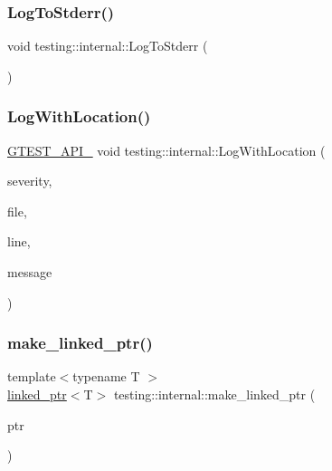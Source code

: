 \subsubsection{\texorpdfstring{LogToStderr()}{LogToStderr()}}
{\footnotesize\ttfamily void testing\+::internal\+::\+Log\+To\+Stderr (\begin{DoxyParamCaption}{ }\end{DoxyParamCaption})\hspace{0.3cm}{\ttfamily [inline]}}

\mbox{\label{namespacetesting_1_1internal_a07f4411f23f8b1b731858be9dda3fdcc}} 
\subsubsection{\texorpdfstring{LogWithLocation()}{LogWithLocation()}}
{\footnotesize\ttfamily \mbox{\hyperlink{_obj__test_2lib_2googletest-release-1_88_81_2googletest_2include_2gtest_2internal_2gtest-port_8h_aa73be6f0ba4a7456180a94904ce17790}{G\+T\+E\+S\+T\+\_\+\+A\+P\+I\+\_\+}} void testing\+::internal\+::\+Log\+With\+Location (\begin{DoxyParamCaption}\item[{\mbox{\hyperlink{namespacetesting_1_1internal_a203d1a8a2147a53d12bbdae40d443914}{testing\+::internal\+::\+Log\+Severity}}}]{severity,  }\item[{const char $\ast$}]{file,  }\item[{int}]{line,  }\item[{const std\+::string \&}]{message }\end{DoxyParamCaption})}

\mbox{\label{namespacetesting_1_1internal_a0d79fad1f772844eff35dfe955f24fd6}} 
\subsubsection{\texorpdfstring{make\_linked\_ptr()}{make\_linked\_ptr()}}
{\footnotesize\ttfamily template$<$typename T $>$ \\
\mbox{\hyperlink{classtesting_1_1internal_1_1linked__ptr}{linked\+\_\+ptr}}$<$T$>$ testing\+::internal\+::make\+\_\+linked\+\_\+ptr (\begin{DoxyParamCaption}\item[{T $\ast$}]{ptr }\end{DoxyParamCaption})}

